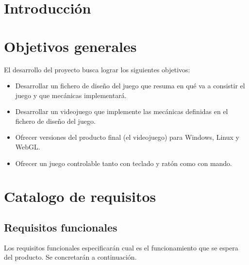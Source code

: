 
\section{Introducción}

\section{Objetivos generales}
El desarrollo del proyecto busca lograr los siguientes objetivos:
\begin{itemize}
\item
Desarrollar un fichero de diseño del juego que resuma en qué va a consistir el juego y que mecánicas implementará.
\item
Desarrollar un videojuego que implemente las mecánicas definidas en el fichero de diseño del juego.
\item
Ofrecer versiones del producto final (el videojuego) para Windows, Linux y WebGL.
\item
Ofrecer un juego controlable tanto con teclado y ratón como con mando.
\end{itemize}

\section{Catalogo de requisitos}
\subsection{Requisitos funcionales}
Los requisitos funcionales especificarán cual es el funcionamiento que se espera del producto. Se concretarán a continuación.

